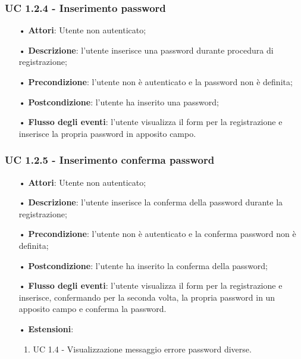 \subsubsection{UC 1.2.4 - Inserimento password}
\begin{itemize}
	\item[•]\textbf{Attori}: Utente non autenticato;
	\item[•]\textbf{Descrizione}: l'utente inserisce una password durante procedura di registrazione;
	\item[•]\textbf{Precondizione}: l'utente non è autenticato e la password non è definita;
	\item[•]\textbf{Postcondizione}: l'utente ha inserito una password;
	\item[•]\textbf{Flusso degli eventi}: l'utente visualizza il form per la registrazione e inserisce la propria password in apposito campo.
\end{itemize}

\subsubsection{UC 1.2.5 - Inserimento conferma password}
\begin{itemize}
	\item[•]\textbf{Attori}: Utente non autenticato;
	\item[•]\textbf{Descrizione}: l'utente inserisce la conferma della password durante la registrazione;
	\item[•]\textbf{Precondizione}: l'utente non è autenticato e la conferma password non è definita;
	\item[•]\textbf{Postcondizione}: l'utente ha inserito la conferma della password;
	\item[•]\textbf{Flusso degli eventi}: l'utente visualizza il form per la registrazione e inserisce, confermando per la seconda volta, la propria password in un apposito campo e conferma la password.
	\item[•] \textbf{Estensioni}:
		\begin{enumerate}
		\item UC 1.4 - Visualizzazione messaggio errore password diverse.
	\end{enumerate}
\end{itemize}

